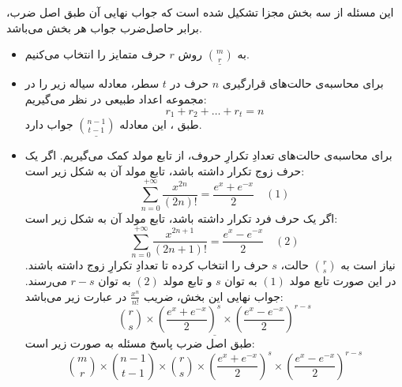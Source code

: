 \p
این مسئله از سه بخش مجزا تشکیل شده است که جواب نهایی آن طبق اصل ضرب، برابر حاصل‌ضرب جواب هر بخش می‌باشد.
\begin{itemize}
\item 
به
$\underline{\binom{m}{r}}$
روش $r$ حرف متمایز را انتخاب می‌کنیم.

\item 
برای محاسبه‌ی حالت‌های قرارگیری 
$n$
حرف در
$t$
سطر، معادله سیاله زیر را در مجموعه اعداد طبیعی در نظر می‌گیریم: 
$$r_1 + r_2 + \ldots + r_t = n$$
طبق 
،
این معادله
$\underline{\binom{n - 1}{t - 1}}$
جواب دارد.

\item
برای محاسبه‌ی حالت‌های تعدادِ تکرارِ حروف، از تابع مولد کمک می‌گیریم.
اگر یک حرف زوج تکرار داشته باشد، تابع مولد آن به شکل زیر است:
\[ \sum_{n=0}^{+\infty} \frac{x^{2n}}{(2n)!} = \frac{e^x + e^{-x}}{2} \quad (1) \]
اگر یک حرف فرد تکرار داشته باشد، تابع مولد آن به شکل زیر است:
\[ \sum_{n=0}^{+\infty} \frac{x^{2n + 1}}{(2n + 1)!} = \frac{e^x - e^{-x}}{2} \quad (2) \]
نیاز است به 
$\binom{r}{s}$
حالت، 
$s$
حرف را انتخاب کرده تا تعدادِ تکرارِ زوج داشته باشند.
در این صورت تابع مولد
$(1)$
به توان 
$s$
و تابع مولد
$(2)$
به توان 
$r-s$
می‌رسند.
 جواب نهایی این بخش، ضریب
$\frac{x^n}{n!}$
در عبارت زیر می‌باشد:
\[ \underline{\binom{r}{s}\times\left({\frac{e^x + e^{-x}}{2}}\right)^s\times\left({\frac{e^x - e^{-x}}{2}}\right)^{r - s}} \]
طبق اصل ضرب پاسخ مسئله به صورت زیر است:
$$\binom{m}{r} \times \binom{n - 1}{t - 1} \times \binom{r}{s}\times\left({\frac{e^x + e^{-x}}{2}}\right)^s\times\left({\frac{e^x - e^{-x}}{2}}\right)^{r - s}  $$
\end{itemize}